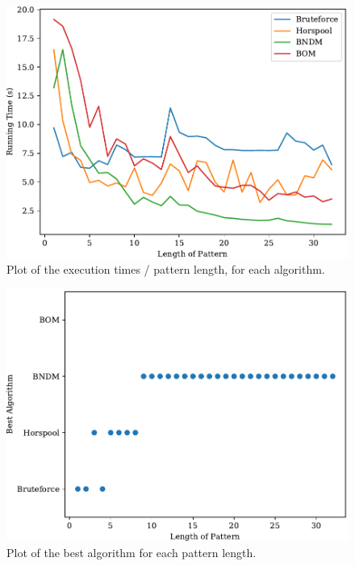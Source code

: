 \documentclass[conference,a4paper]{IEEEtran}
\begin{document}
\begin{figure}[hbp]
    \centering
    \includegraphics[width=0.95\linewidth]{../plots/time_len.pdf}
    \caption{Plot of the execution times / pattern length, for each algorithm.}
    \label{fig:time_len}
  \end{figure}
  \begin{figure}[hbp]
    \centering
    \includegraphics[width=0.95\linewidth]{../plots/alg_len.pdf}
    \caption{Plot of the best algorithm for each pattern length.}
    \label{fig:alg_len}
  \end{figure}
\end{document}
